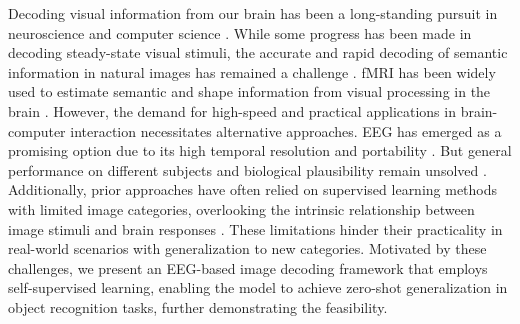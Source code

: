 \label{sec:related_works}
Decoding visual information from our brain has been a long-standing pursuit in neuroscience and computer science \citep{miyawaki2008visual, jia2021unsupervised}.
While some progress has been made in decoding steady-state visual stimuli, the accurate and rapid decoding of semantic information in natural images has remained a challenge \citep{shi2023representativebaseda}.
fMRI has been widely used to estimate semantic and shape information from visual processing in the brain \citep{ho2023interindividual,takagi2022high}.
However, the demand for high-speed and practical applications in brain-computer interaction necessitates alternative approaches. 
EEG has emerged as a promising option due to its high temporal resolution and portability \citep{willett2021highperformance}.
But general performance on different subjects and biological plausibility remain unsolved \citep{ahmed2021object}.
Additionally, prior approaches have often relied on supervised learning methods with limited image categories, overlooking the intrinsic relationship between image stimuli and brain responses \citep{shen2019deep, li2021perils, liu2023brainmachine}.
These limitations hinder their practicality in real-world scenarios with generalization to new categories.
Motivated by these challenges, we present an EEG-based image decoding framework that employs self-supervised learning, enabling the model to achieve zero-shot generalization in object recognition tasks, further demonstrating the feasibility.
